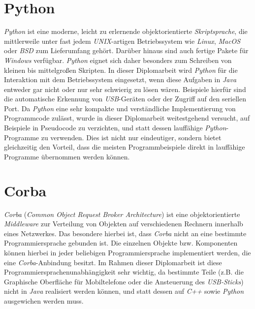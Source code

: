 \section{Python}
    \emph{Python} ist eine moderne, leicht zu erlernende objektorientierte \emph{Skriptsprache}, die mittlerweile 
    unter fast jedem \emph{UNIX}-artigen Betriebssystem wie \emph{Linux}, \emph{MacOS} oder \emph{BSD} zum Lieferumfang 
    gehört. Darüber hinaus sind auch fertige Pakete für \emph{Windows} verfügbar. \emph{Python} eignet sich daher 
    besonders zum Schreiben von kleinen
    bis mittelgroßen Skripten. In dieser Diplomarbeit wird \emph{Python} für die Interaktion mit dem Betriebssystem
    eingesetzt, wenn diese Aufgaben in \emph{Java} entweder gar nicht oder nur sehr schwierig zu lösen wären. Beispiele
    hierfür sind die automatische Erkennung von \emph{USB}-Geräten oder der Zugriff auf den seriellen Port.
    Da \emph{Python} eine sehr kompakte und verständliche Implementierung von Programmcode zulässt, wurde in dieser
    Diplomarbeit weitestgehend versucht, auf Beispiele in Pseudocode zu verzichten, und statt dessen lauffähige
    \emph{Python}-Programme zu verwenden. Dies ist nicht nur eindeutiger, sondern bietet gleichzeitig den Vorteil,
    dass die meisten Programmbeispiele direkt in lauffähige Programme übernommen werden können.

\section{Corba}
    \emph{Corba} (\emph{Common Object Request Broker Architecture}) ist eine objektorientierte \emph{Middleware} 
    zur Verteilung von Objekten auf verschiedenen Rechnern innerhalb eines Netzwerkes. Das besondere hierbei ist, 
    dass \emph{Corba} nicht an eine bestimmte Programmiersprache gebunden ist. Die einzelnen Objekte bzw. Komponenten 
    können hierbei in jeder beliebigen Programmiersprache implementiert werden, die eine \emph{Corba}-Anbindung besitzt.
    Im Rahmen dieser Diplomarbeit ist diese Programmiersprachenunabhängigkeit sehr wichtig, da bestimmte
    Teile (z.B. die Graphische Oberfläche für Mobiltelefone oder die Ansteuerung des \emph{USB-Sticks}) nicht in 
    \emph{Java} realisiert werden können, und statt dessen auf \emph{C++} sowie \emph{Python} ausgewichen werden muss.
